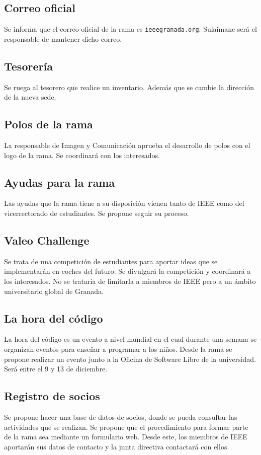 \documentclass[12pt,twoside,openany,a4paper]{book}
\begin{document}
    \subsection{Correo oficial}
    Se informa que el correo oficial de la rama es \texttt{ieeegranada\@ieee.org}. Sulaimane será el responsable de mantener dicho correo.

    \subsection{Tesorería}
    Se ruega al tesorero que realice un inventario. Además que se cambie la dirección de la nueva sede.

    \subsection{Polos de la rama}
    La responsable de Imagen y Comunicación aprueba el desarrollo de polos con el logo de la rama. Se coordinará con los interesados.

    \subsection{Ayudas para la rama}
    Las ayudas que la rama tiene a su disposición vienen tanto de IEEE como del vicerrectorado de estudiantes. Se propone seguir su proceso.

    \subsection{Valeo Challenge}
    Se trata de una competición de estudiantes para aportar ideas que se implementarán en coches del futuro. Se divulgará la competición y coordinará a los interesados. No se trataría de limitarla a miembros de IEEE pero a un ámbito universitario global de Granada.

    \subsection{La hora del código}
    La hora del código es un evento a nivel mundial en el cual durante una semana se organizan eventos para enseñar a programar a los niños. Desde la rama se propone realizar un evento junto a la Oficina de Software Libre de la universidad. Será entre el 9 y 13 de diciembre.

    \subsection{Registro de socios}
    Se propone hacer una base de datos de socios, donde se pueda consultar las actividades que se realizan. Se propone que el procedimiento para formar parte de la rama sea mediante un formulario web. Desde este, los miembros de IEEE aportarán sus datos de contacto y la junta directiva contactará con ellos.
\end{document}
